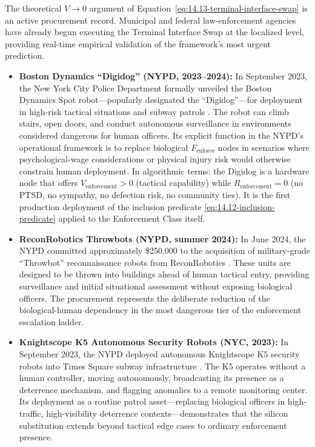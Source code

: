 The theoretical $V \to 0$ argument of Equation~\eqref{eq:14.13-terminal-interface-swap} is an active procurement record. Municipal and federal law-enforcement agencies have already begun executing the Terminal Interface Swap at the localized level, providing real-time empirical validation of the framework's most urgent prediction.

\begin{itemize}
    \item \textbf{Boston Dynamics ``Digidog'' (NYPD, 2023--2024):} In September 2023, the New York City Police Department formally unveiled the Boston Dynamics Spot robot---popularly designated the ``Digidog''---for deployment in high-risk tactical situations and subway patrols \cite{nypd_digidog}. The robot can climb stairs, open doors, and conduct autonomous surveillance in environments considered dangerous for human officers. Its explicit function in the NYPD's operational framework is to replace biological $F_{\text{enforce}}$ nodes in scenarios where psychological-wage considerations or physical injury risk would otherwise constrain human deployment. In algorithmic terms: the Digidog is a hardware node that offers $V_{\text{enforcement}} > 0$ (tactical capability) while $R_{\text{enforcement}} = 0$ (no PTSD, no sympathy, no defection risk, no community ties). It is the first production deployment of the inclusion predicate \eqref{eq:14.12-inclusion-predicate} applied to the Enforcement Class itself.
    
    \item \textbf{ReconRobotics Throwbots (NYPD, summer 2024):} In June 2024, the NYPD committed approximately \$250,000 to the acquisition of military-grade ``Throwbot'' reconnaissance robots from ReconRobotics \cite{reconrobotics_throwbot}. These units are designed to be thrown into buildings ahead of human tactical entry, providing surveillance and initial situational assessment without exposing biological officers. The procurement represents the deliberate reduction of the biological-human dependency in the most dangerous tier of the enforcement escalation ladder.
    
    \item \textbf{Knightscope K5 Autonomous Security Robots (NYC, 2023):} In September 2023, the NYPD deployed autonomous Knightscope K5 security robots into Times Square subway infrastructure \cite{knightscope_k5_nyc}. The K5 operates without a human controller, moving autonomously, broadcasting its presence as a deterrence mechanism, and flagging anomalies to a remote monitoring center. Its deployment as a routine patrol asset---replacing biological officers in high-traffic, high-visibility deterrence contexts---demonstrates that the silicon substitution extends beyond tactical edge cases to ordinary enforcement presence.
\end{itemize}

